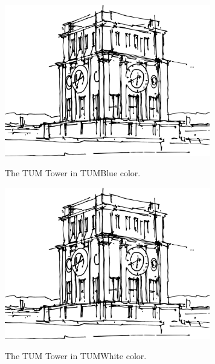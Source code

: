 \documentclass{scrartcl}
\begin{document}
\begin{figure}[h]
  \centering
  \textcolor{TUMBlue}{\includegraphics[width=9cm]{resources/TUM_Tower.pdf}}
  \caption{The TUM Tower in TUMBlue color.}
\end{figure}

\begin{figure}[h]
  \centering
  \textcolor{TUMWhite}{\includegraphics[width=9cm]{resources/TUM_Tower.pdf}}
  \caption{The TUM Tower in TUMWhite color.}
\end{figure}
\end{document}
